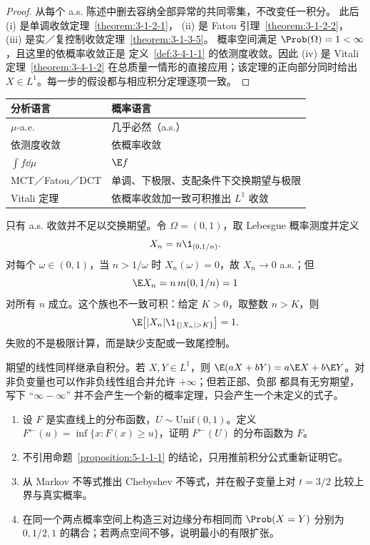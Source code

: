 \begin{proof}
从每个 a.s. 陈述中删去容纳全部异常的共同零集，不改变任一积分。
此后 \textup{(i)} 是单调收敛定理~\ref{theorem:3-1-2-1}，
\textup{(ii)} 是 Fatou 引理~\ref{theorem:3-1-2-2}，
\textup{(iii)} 是实／复控制收敛定理~\ref{theorem:3-1-3-5}。
概率空间满足 $\Prob(\Omega)=1<\infty$，且这里的依概率收敛正是
定义~\ref{def:3-4-1-1} 的依测度收敛。因此 \textup{(iv)} 是
Vitali 定理~\ref{theorem:3-4-1-2} 在总质量一情形的直接应用；该定理的正向部分同时给出
$X\in L^1$。每一步的假设都与相应积分定理逐项一致。
\end{proof}

\begin{center}
\begin{tabular}{@{}ll@{}}
\toprule
分析语言 & 概率语言\\
\midrule
$\mu$-a.e. & 几乎必然（a.s.）\\
依测度收敛 & 依概率收敛\\
$\int f\dd\mu$ & $\E f$\\
MCT／Fatou／DCT & 单调、下极限、支配条件下交换期望与极限\\
Vitali 定理 & 依概率收敛加一致可积推出 $L^1$ 收敛\\
\bottomrule
\end{tabular}
\end{center}

只有 a.s. 收敛并不足以交换期望。令 $\Omega=(0,1)$，取 Lebesgue 概率测度并定义
\[
 X_n=n\1_{(0,1/n)}.
\]
对每个 $\omega\in(0,1)$，当 $n>1/\omega$ 时 $X_n(\omega)=0$，故 $X_n\to0$ a.s.；但
\[
 \E X_n=n\,m(0,1/n)=1
\]
对所有 $n$ 成立。这个族也不一致可积：给定 $K>0$，取整数 $n>K$，则
\[
 \E\bigl[|X_n|\1_{\{|X_n|>K\}}\bigr]=1.
\]
失败的不是极限计算，而是缺少支配或一致尾控制。

期望的线性同样继承自积分。若 $X,Y\in L^1$，则
$\E(aX+bY)=a\E X+b\E Y$。对非负变量也可以作非负线性组合并允许 $+\infty$；但若正部、负部
都具有无穷期望，写下 ``$\infty-\infty$'' 并不会产生一个新的概率定理，只会产生一个未定义的式子。

\begin{exercise}
\begin{enumerate}
  \item 设 $F$ 是实直线上的分布函数，$U\sim\mathrm{Unif}(0,1)$。定义
  $F^{\leftarrow}(u)=\inf\{x:F(x)\ge u\}$，证明
  $F^{\leftarrow}(U)$ 的分布函数为 $F$。
  \item 不引用命题~\ref{proposition:5-1-1-1} 的结论，只用推前积分公式重新证明它。
  \item 从 Markov 不等式推出 Chebyshev 不等式，并在骰子变量上对 $t=3/2$ 比较上界与真实概率。
  \item 在同一个两点概率空间上构造三对边缘分布相同而
  $\Prob(X=Y)$ 分别为 $0,1/2,1$ 的耦合；若两点空间不够，说明最小的有限扩张。
\end{enumerate}
\end{exercise}

